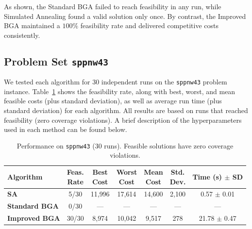 \documentclass[12pt]{article}
\begin{document}
\noindent
As shown, the Standard BGA failed to reach feasibility in any run, while Simulated Annealing found a valid solution only once. By contrast, the Improved BGA maintained a $100\%$ feasibility rate and delivered competitive costs consistently.

\subsection{Problem Set \texttt{sppnw43}}
\label{subsec:sppnw43}

We tested each algorithm for 30 independent runs on the \texttt{sppnw43} problem instance. 
Table~\ref{tab:sppnw43} shows the feasibility rate, along with best, worst, and mean feasible costs (plus standard deviation), as well as average run time (plus standard deviation) for each algorithm. 
All results are based on runs that reached feasibility (zero coverage violations). 
A brief description of the hyperparameters used in each method can be found below.

\vspace{1em}

\begin{table}[htbp]
  \centering
  \label{tab:sppnw43}
  \renewcommand{\arraystretch}{1.1}
  \begin{tabular}{lcccccc}
    \hline
    \textbf{Algorithm} 
      & \makecell{Feas.\\Rate} 
      & \makecell{Best\\Cost} 
      & \makecell{Worst\\Cost} 
      & \makecell{Mean\\Cost} 
      & \makecell{Std.\\Dev.} 
      & \makecell{Time\\(s) $\pm$ SD}\\
    \hline
    \textbf{SA}          
      & 5/30
      & 11{,}996
      & 17{,}614
      & 14{,}600
      & 2{,}100
      & 0.57 $\pm$ 0.01 \\
    \textbf{Standard BGA} 
      & 0/30 
      & — 
      & —
      & —
      & —
      & — \\
    \textbf{Improved BGA} 
      & 30/30 
      & 8{,}974
      & 10{,}042
      & 9{,}517
      & 278
      & 21.78 $\pm$ 0.47 \\
    \hline
  \end{tabular}
  \caption{Performance on \texttt{sppnw43} (30 runs). Feasible solutions have zero coverage violations.}
\end{table}
\end{document}
